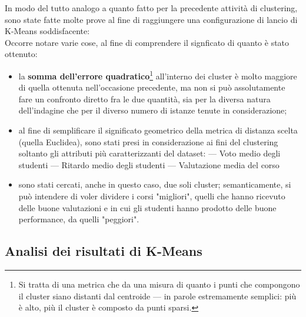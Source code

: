         In modo del tutto analogo a quanto fatto per la precedente attività di clustering, sono state fatte molte prove al fine di raggiungere una configurazione di lancio di K-Means soddisfacente: \\

        

        Occorre notare varie cose, al fine di comprendere il signficato di quanto è stato ottenuto:

        \begin{itemize}
            \item la \textbf{somma dell'errore quadratico}\footnote{Si tratta di una metrica che da una misura di quanto i punti che compongono il cluster siano distanti dal centroide --- in parole estremamente semplici: più è alto, più il cluster è composto da punti sparsi.} all'interno dei cluster è molto maggiore di quella ottenuta nell'occasione precedente, ma non si può assolutamente fare un confronto diretto fra le due quantità, sia per la diversa natura dell'indagine che per il diverso numero di istanze tenute in considerazione;
            \item al fine di semplificare il significato geometrico della metrica di distanza scelta (quella Euclidea), sono stati presi in considerazione ai fini del clustering soltanto gli attributi più caratterizzanti del dataset:
                \subitem --- Voto medio degli studenti
                \subitem --- Ritardo medio degli studenti
                \subitem --- Valutazione media del corso
            \item sono stati cercati, anche in questo caso, due soli cluster; semanticamente, si può intendere di voler dividere i corsi "migliori", quelli che hanno ricevuto delle buone valutazioni e in cui gli studenti hanno prodotto delle buone performance, da quelli "peggiori".
        \end{itemize}

    \subsection{Analisi dei risultati di K-Means}

